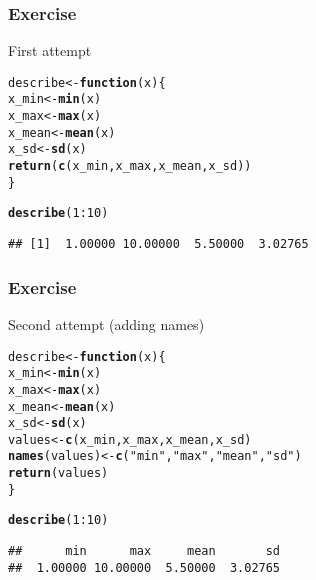 \documentclass[12pt]{beamer}\usepackage[]{graphicx}\usepackage[]{color}
\makeatletter
\newcommand{\hlnum}[1]{\textcolor[rgb]{0.686,0.059,0.569}{#1}}%
\newcommand{\hlstr}[1]{\textcolor[rgb]{0.192,0.494,0.8}{#1}}%
\newcommand{\hlopt}[1]{\textcolor[rgb]{0,0,0}{#1}}%
\newcommand{\hlstd}[1]{\textcolor[rgb]{0.345,0.345,0.345}{#1}}%
\newcommand{\hlkwa}[1]{\textcolor[rgb]{0.161,0.373,0.58}{\textbf{#1}}}%
\newcommand{\hlkwb}[1]{\textcolor[rgb]{0.69,0.353,0.396}{#1}}%
\newcommand{\hlkwc}[1]{\textcolor[rgb]{0.333,0.667,0.333}{#1}}%
\newcommand{\hlkwd}[1]{\textcolor[rgb]{0.737,0.353,0.396}{\textbf{#1}}}%
\newenvironment{kframe}{%
 \def\at@end@of@kframe{}%
 \ifinner\ifhmode%
  \def\at@end@of@kframe{\end{minipage}}%
  \begin{minipage}{\columnwidth}%
 \fi\fi%
 \def\FrameCommand##1{\hskip\@totalleftmargin \hskip-\fboxsep
 \colorbox{shadecolor}{##1}\hskip-\fboxsep
     \hskip-\linewidth \hskip-\@totalleftmargin \hskip\columnwidth}%
 \MakeFramed {\advance\hsize-\width
   \@totalleftmargin\z@ \linewidth\hsize
   \@setminipage}}%
 {\par\unskip\endMakeFramed%
 \at@end@of@kframe}
\newenvironment{knitrout}{}{} %
\makeatother
\begin{document}

\begin{frame}[fragile]
\frametitle{Exercise}

First attempt
\begin{knitrout}\footnotesize
{}\color{fgcolor}\begin{kframe}
\begin{alltt}
\hlstd{describe} \hlkwb{<-} \hlkwa{function}\hlstd{(}\hlkwc{x}\hlstd{) \{}
  \hlstd{x_min} \hlkwb{<-} \hlkwd{min}\hlstd{(x)}
  \hlstd{x_max} \hlkwb{<-} \hlkwd{max}\hlstd{(x)}
  \hlstd{x_mean} \hlkwb{<-} \hlkwd{mean}\hlstd{(x)}
  \hlstd{x_sd} \hlkwb{<-} \hlkwd{sd}\hlstd{(x)}
  \hlkwd{return}\hlstd{(}\hlkwd{c}\hlstd{(x_min, x_max, x_mean, x_sd))}
\hlstd{\}}

\hlkwd{describe}\hlstd{(}\hlnum{1}\hlopt{:}\hlnum{10}\hlstd{)}
\end{alltt}
\begin{verbatim}
## [1]  1.00000 10.00000  5.50000  3.02765
\end{verbatim}
\end{kframe}
\end{knitrout}

\end{frame}


\begin{frame}[fragile]
\frametitle{Exercise}

Second attempt (adding names)
\begin{knitrout}\footnotesize
{}\color{fgcolor}\begin{kframe}
\begin{alltt}
\hlstd{describe} \hlkwb{<-} \hlkwa{function}\hlstd{(}\hlkwc{x}\hlstd{) \{}
  \hlstd{x_min} \hlkwb{<-} \hlkwd{min}\hlstd{(x)}
  \hlstd{x_max} \hlkwb{<-} \hlkwd{max}\hlstd{(x)}
  \hlstd{x_mean} \hlkwb{<-} \hlkwd{mean}\hlstd{(x)}
  \hlstd{x_sd} \hlkwb{<-} \hlkwd{sd}\hlstd{(x)}
  \hlstd{values} \hlkwb{<-} \hlkwd{c}\hlstd{(x_min, x_max, x_mean, x_sd)}
  \hlkwd{names}\hlstd{(values)} \hlkwb{<-} \hlkwd{c}\hlstd{(}\hlstr{"min"}\hlstd{,} \hlstr{"max"}\hlstd{,} \hlstr{"mean"}\hlstd{,} \hlstr{"sd"}\hlstd{)}
  \hlkwd{return}\hlstd{(values)}
\hlstd{\}}

\hlkwd{describe}\hlstd{(}\hlnum{1}\hlopt{:}\hlnum{10}\hlstd{)}
\end{alltt}
\begin{verbatim}
##      min      max     mean       sd 
##  1.00000 10.00000  5.50000  3.02765
\end{verbatim}
\end{kframe}
\end{knitrout}

\end{frame}
\end{document}

